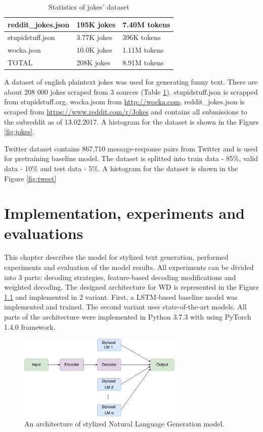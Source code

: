 \begin{table}[ht]
\centering
 \begin{tabular}{|p{4cm}|p{3cm}|p{3cm}|} 
 \hline\hline
 reddit\_jokes.json & 195K jokes & 7.40M tokens \\
 \hline
 stupidstuff.json & 3.77K jokes & 396K tokens \\
 \hline
 wocka.json & 10.0K jokes & 1.11M tokens \\
 \hline\hline
 TOTAL & 208K jokes & 8.91M tokens \\
 \hline\hline
 \end{tabular}
 \caption{Statistics of jokes' dataset}
\label{tab:jokes}
\end{table}


A dataset of english plaintext jokes was used for generating funny text. There are about 208 000 jokes scraped from 3 sources (Table \ref{tab:jokes}). stupidstuff.json is scrapped from stupidstuff.org, wocka.jsom from \url{http://wocka.com}, reddit\_jokes.json is scraped from \url{https://www.reddit.com/r/Jokes} and contains all submissions to the subreddit as of 13.02.2017. A histogram for the dataset is shown in the Figure \ref{fig:jokes}.

Twitter dataset contains 867,710 message-response pairs from Twitter and is used for pretraining baseline model. The dataset is splitted into train data - 85\%, valid data - 10\% and test data - 5\%. A histogram for the dataset is shown in the Figure \ref{fig:tweet}


\chapter{Implementation, experiments and evaluations} \label{implement_experiments}
This chapter describes the model for stylized text generation, performed experiments and evaluation of the model results. All experiments can be divided into 3 parts: decoding strategies, feature-based decoding modifications and weighted decoding. The designed architecture for WD is represented in the Figure \ref{architecture_nlg} and implemented in 2 variant. First, a LSTM-based baseline model was implemented and trained. The second variant uses state-of-the-art models. All parts of the architecture were implemented in Python 3.7.3 with using PyTorch 1.4.0 framework.

\begin{figure}[hbt]
  \centering
  \includegraphics[width=0.7\textwidth]{figures/model.pdf}
  \caption{An architecture of stylized Natural Language Generation model.}
  \label{architecture_nlg}
\end{figure}

